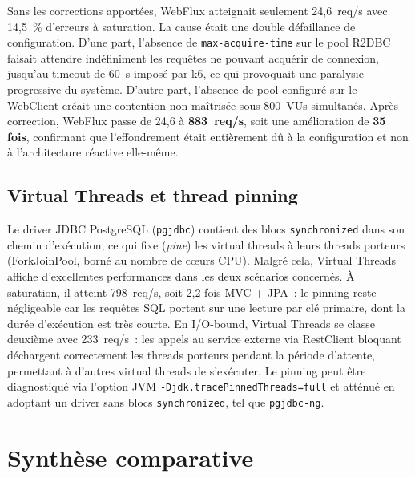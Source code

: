 Sans les corrections apportées, WebFlux atteignait seulement 24,6~req/s avec 14,5~\% d'erreurs à
saturation. La cause était une double défaillance de configuration. D'une part, l'absence de
\texttt{max-acquire-time} sur le pool R2DBC faisait attendre indéfiniment les requêtes ne pouvant
acquérir de connexion, jusqu'au timeout de 60~s imposé par k6, ce qui provoquait une paralysie
progressive du système. D'autre part, l'absence de pool configuré sur le WebClient créait une
contention non maîtrisée sous 800~VUs simultanés. Après correction, WebFlux passe de 24,6 à
\textbf{883~req/s}, soit une amélioration de \textbf{35 fois}, confirmant que l'effondrement
était entièrement dû à la configuration et non à l'architecture réactive elle-même.

\subsection{Virtual Threads et thread pinning}

Le driver JDBC PostgreSQL (\texttt{pgjdbc}) contient des blocs \texttt{synchronized} dans son
chemin d'exécution, ce qui fixe (\emph{pine}) les virtual threads à leurs threads porteurs
(ForkJoinPool, borné au nombre de cœurs CPU). Malgré cela, Virtual Threads affiche d'excellentes
performances dans les deux scénarios concernés. À saturation, il atteint 798~req/s, soit 2,2 fois
MVC + JPA~: le pinning reste négligeable car les requêtes SQL portent sur une lecture par clé
primaire, dont la durée d'exécution est très courte. En I/O-bound, Virtual Threads se classe
deuxième avec 233~req/s~: les appels au service externe via RestClient bloquant déchargent
correctement les threads porteurs pendant la période d'attente, permettant à d'autres virtual
threads de s'exécuter. Le pinning peut être diagnostiqué via l'option JVM
\texttt{-Djdk.tracePinnedThreads=full} et atténué en adoptant un driver sans blocs
\texttt{synchronized}, tel que \texttt{pgjdbc-ng}.

\section{Synthèse comparative}

